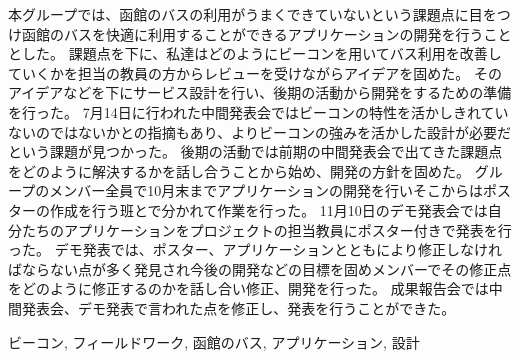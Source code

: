 \documentclass[openany,11pt,papersize]{jsbook}
\begin{document}
  \maketitle
  
  \frontmatter
  
  \begin{jabstract}
  
  
  

本グループでは、函館のバスの利用がうまくできていないという課題点に目をつけ函館のバスを快適に利用することができるアプリケーションの開発を行うこととした。
課題点を下に、私達はどのようにビーコンを用いてバス利用を改善していくかを担当の教員の方からレビューを受けながらアイデアを固めた。
そのアイデアなどを下にサービス設計を行い、後期の活動から開発をするための準備を行った。
7月14日に行われた中間発表会ではビーコンの特性を活かしきれていないのではないかとの指摘もあり、よりビーコンの強みを活かした設計が必要だという課題が見つかった。
後期の活動では前期の中間発表会で出てきた課題点をどのように解決するかを話し合うことから始め、開発の方針を固めた。
グループのメンバー全員で10月末までアプリケーションの開発を行いそこからはポスターの作成を行う班とで分かれて作業を行った。
11月10日のデモ発表会では自分たちのアプリケーションをプロジェクトの担当教員にポスター付きで発表を行った。
デモ発表では、ポスター、アプリケーションとともにより修正しなければならない点が多く発見され今後の開発などの目標を固めメンバーでその修正点をどのように修正するのかを話し合い修正、開発を行った。
成果報告会では中間発表会、デモ発表で言われた点を修正し、発表を行うことができた。

\begin{jkeyword}
ビーコン, フィールドワーク, 函館のバス, アプリケーション, 設計
\end{jkeyword}
\end{jabstract}
\end{document}
